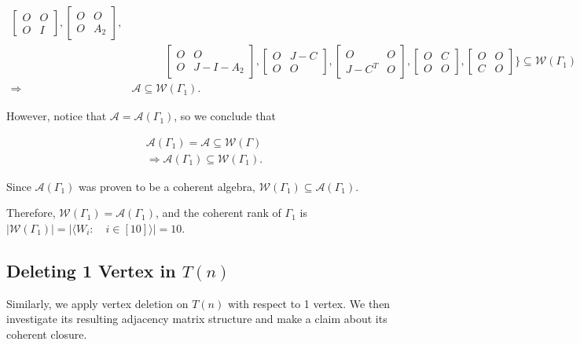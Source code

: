 \begin{align*}
    \begin{bmatrix}
        O&O\\O&I
    \end{bmatrix},
    \begin{bmatrix}
        O&O\\O&A_2
    \end{bmatrix},\\
    &\quad\quad\quad\begin{bmatrix}
        O&O\\O&J-I-A_2
    \end{bmatrix},
    \begin{bmatrix}
        O&J-C\\O&O
    \end{bmatrix},
    \begin{bmatrix}
        O&O\\J-C^T&O
    \end{bmatrix},
    \begin{bmatrix}
        O&C\\O&O
    \end{bmatrix},
    \begin{bmatrix}
        O&O\\C&O
    \end{bmatrix}
    \} \subseteq \mathcal{W}(\Gamma_1)\\
    \Rightarrow&\mathcal{A} \subseteq \mathcal{W}(\Gamma_1).
\end{align*}

However, notice that $\mathcal{A} = \mathcal{A}(\Gamma_1)$, so we conclude that

\begin{align*}
    \mathcal{A}(\Gamma_1) = \mathcal{A} \subseteq \mathcal{W}(\Gamma)\\
    \Rightarrow \mathcal{A}(\Gamma_1)\subseteq\mathcal{W}(\Gamma_1).
\end{align*}

Since $\mathcal{A}(\Gamma_1)$ was proven to be a coherent algebra, $\mathcal{W}(\Gamma_1)\subseteq\mathcal{A}(\Gamma_1)$. 

Therefore, $\mathcal{W}(\Gamma_1) = \mathcal{A}(\Gamma_1)$, and the coherent rank of $\Gamma_1$ is $|\mathcal{W}(\Gamma_1)| = |\langle W_i:\quad i \in[10]\rangle| = 10$.

\newpage
\subsection{Deleting 1 Vertex in \texorpdfstring{$T(n)$}{Tn}}
Similarly, we apply vertex deletion on $T(n)$ with respect to 1 vertex. We then investigate its resulting adjacency matrix structure and make a claim about its coherent closure.


